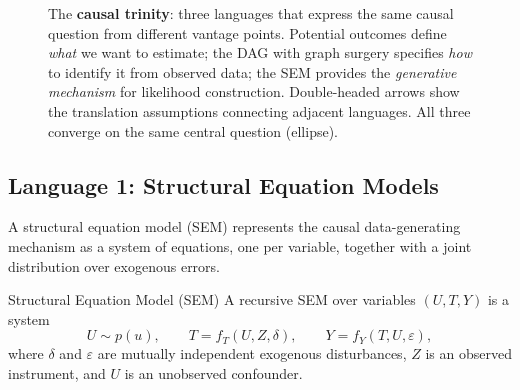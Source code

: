 \documentclass[master.tex]{subfiles}
\begin{document}
\begin{figure}[h]
\caption{The \textbf{causal trinity}: three languages that express the same
causal question from different vantage points. Potential outcomes
define \emph{what} we want to estimate; the DAG with graph surgery specifies
\emph{how} to identify it from observed data; the SEM provides the
\emph{generative mechanism} for likelihood construction. Double-headed arrows
show the translation assumptions connecting adjacent languages. All three
converge on the same central question (ellipse).}
\label{w1:fig:trinity}
\end{figure}

\subsection{Language 1: Structural Equation Models}

A structural equation model (SEM) represents the causal data-generating
mechanism as a system of equations, one per variable, together with a joint
distribution over exogenous errors.

\begin{defn}{Structural Equation Model (SEM)}
A recursive SEM over variables $(U, T, Y)$ is a system
\[
  U \sim p(u), \qquad
  T = f_T(U, Z, \delta), \qquad
  Y = f_Y(T, U, \varepsilon),
\]
where $\delta$ and $\varepsilon$ are mutually independent exogenous
disturbances, $Z$ is an observed instrument, and $U$ is an unobserved
confounder.
\end{defn}
\end{document}
